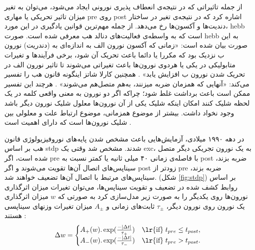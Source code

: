 \documentclass[12pt]{report}
\begin{document}
	از جمله تاثیراتی که در نتیجه‌ی انعطاف پذیری نورونی ایجاد می‌شود، می‌توان به تغیر میزان تاثیر تحریکی یا مهاری \gls{pre} روی \gls{post} اشاره کرد که در نتیجه‌ی تغیر در ساختار دندیت‌ها و آکسون‌ها رخ می‌دهد.
	از جمله مهم‌ترین ‌قوانین یادگیری در این مورد، \gls{hebb}‌ است که به واسطه‌ی فعالیت‌های دنالد هب معرفی شده است.
	صورت \gls{hebb} به این صورت بیان شده است: «زمانی که آکسون نورون الف به اندازه‌ای به (دندریت) نورون ب نزدیک  بود که مکررا یا دائما باعث تحریک آن شود، برخی فر‌آیند‌ها و تغیرات متابولیکی در یکی یا هر‌دوی نورو‌ن‌ها باعث تغیراتی می‌شوند تا تاثیر نورون الف در تحریک شدن نورون ب افزایش یابد»
	\cite{hebb1949organization}.
	همچنین کارلا شاتز اینگونه قانون هب را تفسیر می‌کند: «آنهایی که همزمان ضربه میزنند، به‌هم متصل‌هم می‌شوند»
	\cite{shatz1992developing}.
	هرچند‌ این تفسیر ممکن است باعث برداشت غلط شود؛ چراکه اگر دو نورون به معنی واقعی کلمه در یک لحظه شلیک کنند امکان اینکه شلیک یکی از آن نورون‌ها معلول شلیک نورون دیگر باشد وجود نخواد داشت. بیشتر از موضوع همزمانی، موضوع ارتباط علت و معلولی بین شلیک نورون‌ها است که دارای اهمیت است
	\cite{granger1969investigating}.
	
	
	در دهه ۱۹۹۰ میلادی، آزمایش‌هایی باعث مشخص شدن پایه‌های نوروفیزیولوژی قانون هب بر اساس \gls{stdp} شدند.
	\cite{caporale2008spike} 
	مشخص شد وقتی یک \gls{exc}، به یک نورون تجریکی دیگر متصل شده است، اگر \gls{pre} با فاصله‌ی زمانی ۴۰ میلی ثانیه یا کمتر نسبت به \gls{post} ضربه بزند، سیناپس‌های اتصال آن‌ها تقویت می‌شوند و اگر \gls{post} زودتر از \gls{pre} ضربه بزند، سیناپس‌های مرتبط با اتصال آن‌ها تضعیف خواهند شد. (شکل \ref{fig:stdp})
	بر اساس روابط کشف شده در تضعیف و تقویت سیناپس‌ها، می‌توان تغیرات میزان اثرگذاری نورون‌ها روی یکدیگر را به صورت زیر مدل‌سازی کرد به صورتی که $w$ میزان اثرگذاری یک نورون روی نورون دیگر، $\tau_\pm$ ثابت‌های زمانی  و $A_\pm$ میزان تغیرات وزنهای سیناپسی هستند
	\cite{gerstner2014neuronal}:
	\begin{align}
		\Delta w =
		\begin{cases}
			A_+(w).\exp(\frac{-|\Delta t|}{\tau_+})  & \text{\lr{if}}\; t_{pre} \leq t_{post}, \\
			A_-(w).\exp(\frac{-|\Delta t|}{\tau_-})  & \text{\lr{if}}\; t_{pre} > t_{post}.
		\end{cases}
		\label{eq:stdp}
	\end{align}
	
\end{document}

